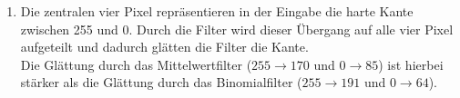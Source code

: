 \begin{enumerate}
	\item Die zentralen vier Pixel repräsentieren in der Eingabe die harte Kante zwischen 255 und 0.
	      Durch die Filter wird dieser Übergang auf alle vier Pixel aufgeteilt
	      und dadurch glätten die Filter die Kante.\\
	      Die Glättung durch das Mittelwertfilter ($255 \rightarrow 170$ und $0 \rightarrow 85$) ist hierbei stärker
	      als die Glättung durch das Binomialfilter ($255 \rightarrow 191$ und $0 \rightarrow 64$).
\end{enumerate}